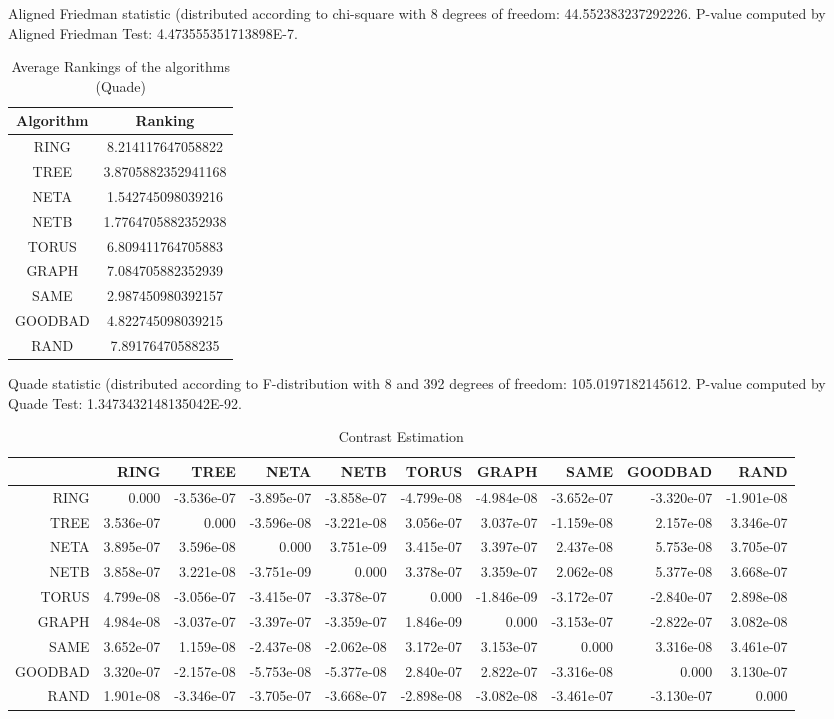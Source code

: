 \documentclass[a4paper,10pt]{article}
\begin{document}
\begin{landscape}
Aligned Friedman statistic (distributed according to chi-square with 8 degrees of freedom: 44.552383237292226. 
P-value computed by Aligned Friedman Test: 4.473555351713898E-7.\newline


\newpage

\begin{table}[!htp]
\centering
\caption{Average Rankings of the algorithms (Quade)
}\begin{tabular}{c|c}
Algorithm&Ranking\\
\hline
 RING&8.214117647058822\\
 TREE&3.8705882352941168\\
 NETA&1.542745098039216\\
 NETB&1.7764705882352938\\
 TORUS&6.809411764705883\\
 GRAPH&7.084705882352939\\
 SAME&2.987450980392157\\
 GOODBAD&4.822745098039215\\
 RAND&7.89176470588235\\
\end{tabular}
\end{table}
Quade statistic (distributed according to F-distribution with 8 and 392 degrees of freedom: 105.0197182145612. 
P-value computed by Quade Test: 1.3473432148135042E-92.\newline


\newpage

\begin{table}[!htp]
\centering\tiny
\caption{Contrast Estimation}
\begin{tabular}{
|r|r|r|r|r|r|r|r|r|r|}
\hline
 & RING& TREE& NETA& NETB& TORUS& GRAPH& SAME& GOODBAD& RAND\\
\hline
 RING&0.000&-3.536e-07&-3.895e-07&-3.858e-07&-4.799e-08&-4.984e-08&-3.652e-07&-3.320e-07&-1.901e-08\\
\hline
 TREE&3.536e-07&0.000&-3.596e-08&-3.221e-08&3.056e-07&3.037e-07&-1.159e-08&2.157e-08&3.346e-07\\
\hline
 NETA&3.895e-07&3.596e-08&0.000&3.751e-09&3.415e-07&3.397e-07&2.437e-08&5.753e-08&3.705e-07\\
\hline
 NETB&3.858e-07&3.221e-08&-3.751e-09&0.000&3.378e-07&3.359e-07&2.062e-08&5.377e-08&3.668e-07\\
\hline
 TORUS&4.799e-08&-3.056e-07&-3.415e-07&-3.378e-07&0.000&-1.846e-09&-3.172e-07&-2.840e-07&2.898e-08\\
\hline
 GRAPH&4.984e-08&-3.037e-07&-3.397e-07&-3.359e-07&1.846e-09&0.000&-3.153e-07&-2.822e-07&3.082e-08\\
\hline
 SAME&3.652e-07&1.159e-08&-2.437e-08&-2.062e-08&3.172e-07&3.153e-07&0.000&3.316e-08&3.461e-07\\
\hline
 GOODBAD&3.320e-07&-2.157e-08&-5.753e-08&-5.377e-08&2.840e-07&2.822e-07&-3.316e-08&0.000&3.130e-07\\
\hline
 RAND&1.901e-08&-3.346e-07&-3.705e-07&-3.668e-07&-2.898e-08&-3.082e-08&-3.461e-07&-3.130e-07&0.000\\
\hline


\end{tabular}
\end{table}
\end{landscape}
\end{document}
